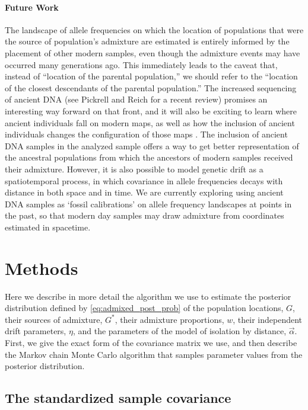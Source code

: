 \documentclass[10pt,letterpaper]{article}
\newcommand{\identifyadmixsource}[1]{{#1^{*}}}
\begin{document}
\paragraph{Future Work}
The landscape of allele frequencies on which the location of populations that were the source of population's admixture
are estimated is entirely informed by the placement of other modern samples,
even though the admixture events may have occurred many generations ago.
This immediately leads to the caveat that, instead of ``location of the parental population,''
we should refer to the ``location of the closest descendants of the parental population.''
The increased sequencing of ancient DNA (see Pickrell and Reich \cite{pickrell_reich:14} for a recent review) promises an interesting way forward on that front,
and it will also be exciting to learn where ancient individuals fall on modern maps, 
as well as how the inclusion of ancient individuals changes the configuration of those maps \cite{skoglund_investigating_2014}.
The inclusion of ancient DNA samples in the analyzed sample offers a way to get better representation of the ancestral populations from which the ancestors of modern samples received their admixture.  
However, it is also possible to model genetic drift as a spatiotemporal process, 
in which covariance in allele frequencies decays with distance in both space and in time.  
We are currently exploring using ancient DNA samples as  `fossil calibrations' on allele frequency landscapes at points in the past, 
so that modern day samples may draw admixture from coordinates estimated in spacetime.

\section*{Methods}
Here we describe in more detail the algorithm we use to estimate the posterior distribution defined by \eqref{eq:admixed_post_prob} 
of the population locations, $G$, 
their sources of admixture, $\identifyadmixsource{G}$, 
their admixture proportions, $w$, 
their independent drift parameters, $\eta$, 
and the parameters of the model of isolation by distance, $\vec{\alpha}$.  
First, we give the exact form of the covariance matrix we use,
and then describe the Markov chain Monte Carlo algorithm 
that samples parameter values from the posterior distribution.


\subsection*{The standardized sample covariance}
\label{ss:cov_methods}
\end{document}
